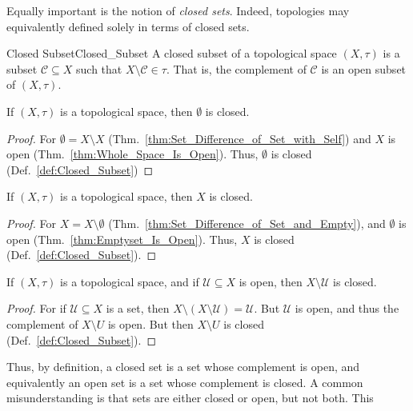     Equally important is the notion of \textit{closed sets}. Indeed, topologies
    may equivalently defined solely in terms of closed sets.
    \begin{fdefinition}{Closed Subset}{Closed_Subset}
        A closed subset of a \gls{topological space} $(X,\tau)$ is a
        \gls{subset} $\mathcal{C}\subseteq{X}$ such that
        $X\setminus\mathcal{C}\in\tau$. That is, the complement of $\mathcal{C}$
        is an open subset of $(X,\tau)$.
    \end{fdefinition}
    \begin{theorem}
        \label{thm:Emptyset_Is_Closed}%
        If $(X,\tau)$ is a topological space, then $\emptyset$ is closed.
    \end{theorem}
    \begin{proof}
        For $\emptyset=X\setminus{X}$
        (Thm.~\ref{thm:Set_Difference_of_Set_with_Self}) and $X$ is open
        (Thm.~\ref{thm:Whole_Space_Is_Open}). Thus, $\emptyset$ is closed
        (Def.~\ref{def:Closed_Subset})
    \end{proof}
    \begin{theorem}
        \label{thm:Whole_Space_Is_Closed}%
        If $(X,\tau)$ is a topological space, then $X$ is closed.
    \end{theorem}
    \begin{proof}
        For $X=X\setminus\emptyset$
        (Thm.~\ref{thm:Set_Difference_of_Set_and_Empty}), and $\emptyset$ is
        open (Thm.~\ref{thm:Emptyset_Is_Open}). Thus, $X$ is closed
        (Def.~\ref{def:Closed_Subset}).
    \end{proof}
    \begin{theorem}
        \label{thm:Complement_of_Open_is_Closed}%
        If $(X,\tau)$ is a topological space, and if $\mathcal{U}\subseteq{X}$
        is open, then $X\setminus\mathcal{U}$ is closed.
    \end{theorem}
    \begin{proof}
        For if $\mathcal{U}\subseteq{X}$ is a set, then
        $X\setminus(X\setminus\mathcal{U})=\mathcal{U}$. But $\mathcal{U}$ is
        open, and thus the complement of $X\setminus{U}$ is open. But then
        $X\setminus{U}$ is closed (Def.~\ref{def:Closed_Subset}).
    \end{proof}
    Thus, by definition, a closed set is a set whose complement is open, and
    equivalently an open set is a set whose complement is closed. A common
    misunderstanding is that sets are either closed or open, but not both. This
